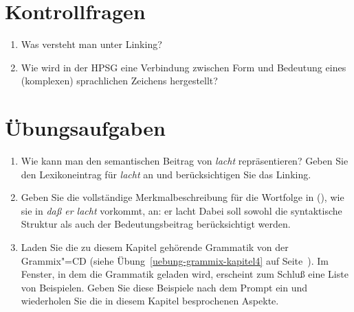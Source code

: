 \section*{Kontrollfragen}


\begin{enumerate}
\item Was versteht man unter Linking?
\item Wie wird in der HPSG eine Verbindung zwischen Form und Bedeutung eines (komplexen)
      sprachlichen Zeichens hergestellt?
\end{enumerate}

\section*{Übungsaufgaben}

\begin{enumerate}
\item Wie kann man den semantischen Beitrag von \emph{lacht} repräsentieren? Geben Sie den
  Lexikoneintrag für \emph{lacht} an und berücksichtigen Sie das Linking.
\item Geben Sie die vollständige Merkmalbeschreibung für die Wortfolge in (), wie sie in
  \emph{daß er lacht} vorkommt,  an: 
      \ea
      er lacht
      \z
      Dabei soll sowohl die syntaktische Struktur als auch der Bedeutungsbeitrag berücksichtigt werden.

\item Laden Sie die zu diesem Kapitel gehörende Grammatik von der Grammix"=CD
(siehe Übung~\ref{uebung-grammix-kapitel4} auf Seite~\pageref{uebung-grammix-kapitel4}).
Im Fenster, in dem die Grammatik geladen wird, erscheint zum Schluß eine Liste von Beispielen.
Geben Sie diese Beispiele nach dem Prompt ein und wiederholen Sie die in diesem Kapitel besprochenen
Aspekte.
\end{enumerate}

